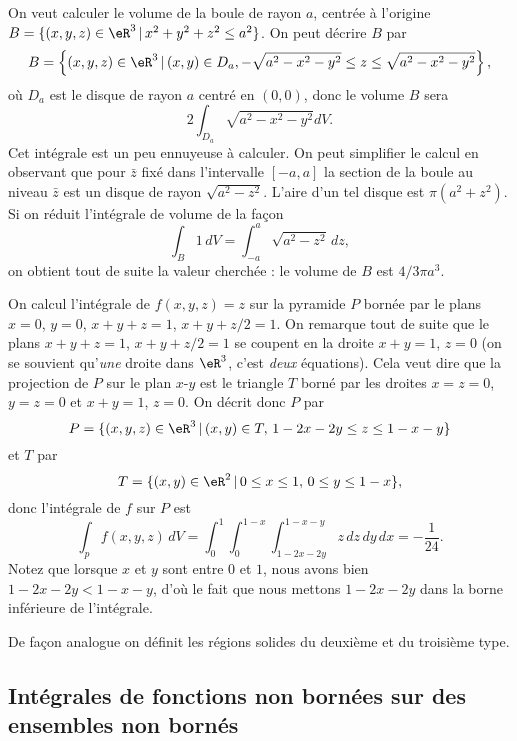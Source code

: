 \begin{example}
On veut calculer le volume de la boule de rayon $a$, centrée à l'origine $B=\{(x,y,z)\in\eR^3\,\vert\, x^2+y^2+z^2\leq a^2 \}$. On peut décrire $B$ par
\[
  B=\left\{(x,y,z)\in\eR^3\,\vert\, (x,y)\in D_a, -\sqrt{a^2-x^2-y^2}\leq z\leq \sqrt{a^2-x^2-y^2}  \right\},
\]
où $D_a$ est le disque de rayon $a$ centré en $(0,0)$, donc le volume $B$ sera
\[
2 \int_{D_a}\sqrt{a^2-x^2-y^2} dV.
\]
Cet intégrale est un peu ennuyeuse à calculer. On peut simplifier le calcul en observant que pour $\bar z$ fixé dans l'intervalle $[-a,a]$ la section de la boule au niveau $\bar z$ est un disque de rayon $\sqrt{a^2-z^2}$. L'aire d'un tel disque est  $\pi (a^2+z^2)$. Si on réduit l'intégrale de volume de la façon
\[
\int_{B} 1\, dV=\int_{-a}^{a}  \sqrt{a^2-z^2}\, dz,
\]
on obtient tout de suite la valeur cherchée : le volume de $B$ est $4/3 \pi a^3$.
\end{example}
\begin{example}
	On calcul l'intégrale de $f(x,y,z)=z$ sur la pyramide $P$ bornée par le plans $x=0$, $y=0$, $x+y+z=1$, $x+y+z/2=1$. On remarque tout de suite que le plans $x+y+z=1$, $x+y+z/2=1$ se coupent en la droite $x+y=1$, $z=0$ (on se souvient qu'\emph{une} droite dans $\eR^3$, c'est \emph{deux} équations). Cela veut dire que la projection de $P$ sur le plan $x$-$y$ est le  triangle $T$ borné par les droites $x=z=0$, $y=z=0$ et $x+y=1$, $z=0$.
On  décrit donc $P$ par
\[
P=\{(x,y,z)\in\eR^3\,\vert\, (x,y)\in T, \, 1-2x-2y\leq z\leq 1-x-y\}
\]
et $T$ par
\[
T=\{(x,y)\in\eR^2\,\vert\, 0\leq x\leq 1,\,  0\leq y\leq 1-x\},
\]
donc l'intégrale de $f$ sur $P$ est
\[
\int_pf(x,y,z)\, dV= \int_{0}^{1}\int_{0}^{1-x}\int_{1-2x-2y}^{1-x-y}z \,dz\,dy\,dx=-\frac{1}{ 24 }.
\]
Notez que lorsque $x$ et $y$ sont entre $0$ et $1$, nous avons bien $1-2x-2y<1-x-y$, d'où le fait que nous mettons $1-2x-2y$ dans la borne inférieure de l'intégrale.
\end{example}

De façon analogue on définit les régions solides du deuxième et du troisième type.

					\subsection[Fonctions et ensembles non bornés]{Intégrales de fonctions non bornées sur des ensembles non bornés}

